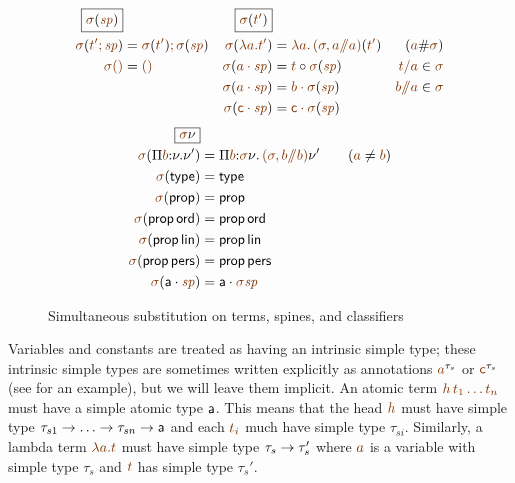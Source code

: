 \begin{figure}
\begin{align*}
\fbox{$\lf{\sigma}(\lf{\spi})$}&
&
\fbox{$\lf{\sigma}(\lf{t'})$}
\\
\lf{\sigma}(\lf{t'; \spi}) 
 & = \lf{\no{\lf{\sigma}(\lf{t'})}; \no{\lf{\sigma}(\lf{\spi})}} &
\lf{\sigma}(\lf{\lambda a.t'}) 
 & = \lf{\lambda a.\,\no{\lf{(\sigma, a/\!\!/a)}(\lf{t'})}}
 & (\lf{a} \# \lf{\sigma})
\\
\lf{\sigma}\lfnil 
 & = \lfnil &
\lf{\sigma}(\lf{\lfroot{a}{\spi}}) 
 & = \subst{\lf t}{\no{\lf{\sigma}(\lf{\spi})}}
      & \lf{t/a} \in \lf{\sigma} 
\\
& &
\lf{\sigma}(\lf{\lfroot{a}{\spi}}) 
 & = \lf{\lfroot{b}{\no{\lf{\sigma}(\lf{\spi})}}} 
      & \lf{b/\!\!/a} \in \lf{\sigma} 
\\
& &
\lf{\sigma}(\lf{\lfroot{\sf c}{\spi}}) 
 & = \lf{\lfroot{\sf c}{\no{\lf{\sigma}(\lf{\spi})}}} 
\end{align*}\begin{align*}
\fbox{$\lf{\sigma}{\nu}$} &
\\
\lf{\sigma}(\lfpi{b}{\nu}{\nu'})
 & = \lfpi{b}{\lf{\sigma}\nu}{\,\lf{(\sigma, b/\!\!/b)}\nu'}
     \qquad (\lf a \neq \lf b) 
\\
\lf{\sigma}({\sf type})
  & = {\sf type}
\\ 
\lf{\sigma}({\sf prop}) 
 & = {\sf prop} 
\\
\lf{\sigma}({\sf prop}\,{\sf ord}) 
 & = {\sf prop}\,{\sf ord} 
\\
\lf{\sigma}({\sf prop}\,{\sf lin}) 
 & = {\sf prop}\,{\sf lin} 
\\
\lf{\sigma}({\sf prop}\,{\sf pers}) 
 & = {\sf prop}\,{\sf pers} 
\\
\lf{\sigma}(\lfroot{\sf a}{\spi}) 
 & = \lfroot{\sf a}{{\lf{\sigma\spi}}}
\end{align*}
\caption{Simultaneous substitution on terms, spines, and classifiers}
\label{fig:simsubst}
\end{figure}

Variables and constants are treated as having an intrinsic simple
type; these intrinsic simple types are sometimes written explicitly as
annotations $\lf{a}^{\tau_s}$ or $\lf{\sf c}^{\tau_s}$ (see
\cite{pfenning08church} for an example), but we will leave them
implicit.  An atomic term $\lf{h\,t_1\ldots t_n}$ must have a
simple atomic type ${\sf a}$. This means that the head $\lf h$ must
have simple type $\tau_{s1} \rightarrow \ldots \rightarrow \tau_{sn} \rightarrow
{\sf a}$ and each $\lf{t_i}$ much have simple type
$\tau_{si}$. Similarly, a lambda term $\lf{\lambda a. t}$ must have
simple type $\tau_s \rightarrow \tau_s'$ where $\lf a$ is a variable with
simple type $\tau_s$ and $\lf t$ has simple type $\tau_s'$.

